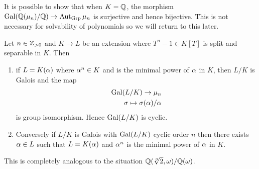 \documentclass{article}
\begin{document}
\begin{rmk}
  It is possible to show that when $K = \mathbb{Q}$,
  the morphism $\operatorname{Gal}(\mathbb{Q}(\mu_n) / \mathbb{Q}) \to \operatorname{Aut}_{\mathrm{Grp}} \mu_n$ is surjective
  and hence bijective.
  This is not necessary for solvability of polynomials
  so we will return to this later.
\end{rmk}

\begin{prop}
  
  Let $n \in \mathbb{Z}_{> 0}$ and 
  $K \to L$ be an extension where $T^n - 1 \in K[T]$ is split 
  and separable in $K$.
  Then \begin{enumerate}
    \item if $L = K(\alpha)$ where $\alpha^n \in K$
    and is the minimal power of $\alpha$ in $K$, 
    then $L / K$ is Galois 
    and the map \begin{align*}
      \operatorname{Gal}(L / K) \to \mu_n \\
      \sigma \mapsto \sigma(\alpha) / \alpha
    \end{align*}
    is group isomorphism.
    Hence $\operatorname{Gal}(L / K)$ is cyclic.
    \item Conversely if $L / K$ is Galois with $\operatorname{Gal}(L / K)$ cyclic order $n$
    then there exists $\alpha \in L$ such that $L = K(\alpha)$ and $\alpha^n$ is the
    minimal power of $\alpha$ in $K$.
  \end{enumerate}
\end{prop}
This is completely analogous to the situation 
$\mathbb{Q}(\sqrt[3]{2} , \omega) / \mathbb{Q}(\omega)$.
\end{document}

